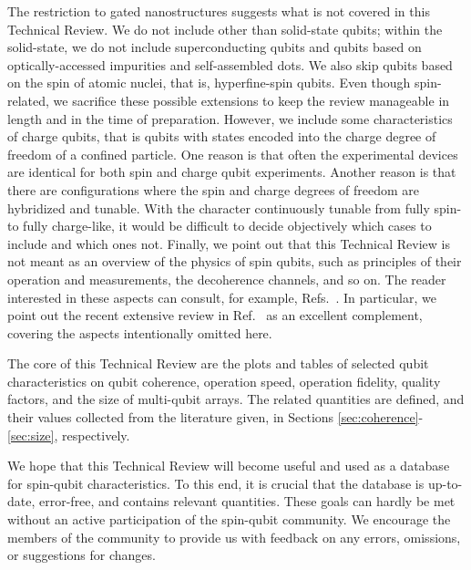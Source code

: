 \documentclass[aps, prx, showpacs, twocolumn, superscriptaddress, notitlepage, longbibliography, floatfix, nofootinbib]{revtex4-2}
\begin{document}
The restriction to gated nanostructures suggests what is not covered in this Technical Review. We do not include other than solid-state qubits; within the solid-state, we do not include superconducting qubits and qubits based on optically-accessed impurities and self-assembled dots. We also skip qubits based on the spin of atomic nuclei, that is, hyperfine-spin qubits. Even though spin-related, we sacrifice these possible extensions to keep the review manageable in length and in the time of preparation. However, we include some characteristics of charge qubits, that is qubits with states encoded into the charge degree of freedom of a confined particle. One reason is that often the experimental devices are identical for both spin and charge qubit experiments. Another reason is that there are configurations where the spin and charge degrees of freedom are hybridized and tunable. With the character continuously tunable from fully spin- to fully charge-like, it would be difficult to decide objectively which cases to include and which ones not. Finally, we point out that this Technical Review is not meant as an overview of the physics of spin qubits, such as principles of their operation and measurements, the decoherence channels, and so on. The reader interested in these aspects can consult, for example, Refs.~\cite{oosterkamp_photon_1999, van_der_wiel_electron_2002, schliemann_electron_2003, hanson_spins_2007, kloeffel_prospects_2013, schreiber_quantum_2014, tahan_democratizing_2020, chatterjee_semiconductor_2021, gonzalez-zalba_scaling_2020, scappucci_germanium_2021, oiwa_conversion_2017, vandersypen_quantum_2019, kuemmeth_roadmap_2020, chatterjee_semiconductor_2021}. In particular, we point out the recent extensive review in Ref.~\cite{burkard_semiconductor_2021} as an excellent complement, covering the aspects intentionally omitted here.


The core of this Technical Review are the plots and tables of selected qubit characteristics on qubit coherence, operation speed, operation fidelity, quality factors, and the size of multi-qubit arrays. The related quantities are defined, and their values collected from the literature given, in Sections \ref{sec:coherence}-\ref{sec:size}, respectively.


We hope that this Technical Review will become useful and used as a database for spin-qubit characteristics. To this end, it is crucial that the database is up-to-date, error-free, and contains relevant quantities. These goals can hardly be met without an active participation of the spin-qubit community. We encourage the members of the community to provide us with feedback on any errors, omissions, or suggestions for changes. 
\end{document}
